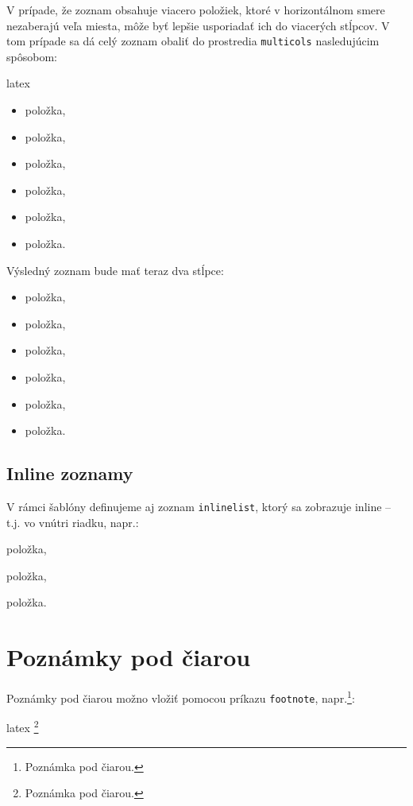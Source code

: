 V prípade, že zoznam obsahuje viacero položiek, ktoré v horizontálnom smere nezaberajú veľa miesta, môže byť lepšie usporiadať ich do viacerých stĺpcov. V tom prípade sa dá celý zoznam obaliť do prostredia \texttt{multicols} nasledujúcim spôsobom:
\begin{inlinecode}{latex}
\begin{multicols}{2}
\begin{itemize}
\item položka,
\item položka,
\item položka,
\item položka,
\item položka,
\item položka.
\end{itemize}
\end{multicols}
\end{inlinecode}

Výsledný zoznam bude mať teraz dva stĺpce:
\begin{multicols}{2}
\begin{itemize}
\item položka,
\item položka,
\item položka,
\item položka,
\item položka,
\item položka.
\end{itemize}
\end{multicols}

\subsection{Inline zoznamy}

V rámci šablóny definujeme aj zoznam \texttt{inlinelist}, ktorý sa zobrazuje inline -- t.j. vo vnútri riadku, napr.:
\begin{inlinelist}
\item položka,
\item položka,
\item položka.
\end{inlinelist}

\section{Poznámky pod čiarou}

Poznámky pod čiarou možno vložiť pomocou príkazu \texttt{footnote}, napr.\footnote{Poznámka pod čiarou.}:
\begin{inlinecode}{latex}
\footnote{Poznámka pod čiarou.}
\end{inlinecode}

